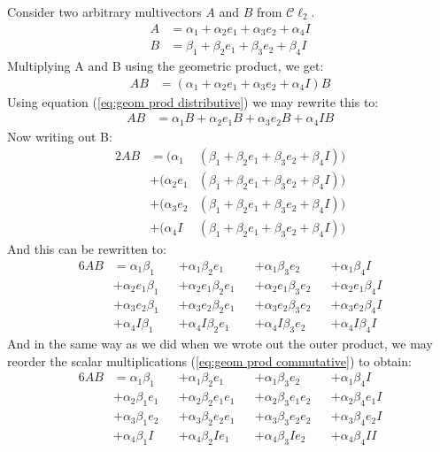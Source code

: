 \documentclass[10pt]{report}
\begin{document}
Consider two arbitrary multivectors $A$ and $B$ from
$\mathcal{C}\ell_2$.
\begin{align}
    A &= \alpha_1 + \alpha_2 e_1 +\alpha_3 e_2 + \alpha_4 I \nonumber \\
    B &= \beta_1 + \beta_2 e_1 + \beta_3 e_2 + \beta_4 I    \nonumber
\end{align}
Multiplying A and B using the geometric product, we get:
\begin{align}
    AB &= (\alpha_1 + \alpha_2 e_1 +\alpha_3 e_2 + \alpha_4 I)B \nonumber
\end{align}
Using equation (\ref{eq:geom prod distributive}) we may rewrite
this to:
\begin{align}
    AB &= \alpha_1 B + \alpha_2 e_1 B + \alpha_3 e_2 B + \alpha_4 I B \nonumber
\end{align}
Now writing out B:
\begin{alignat}{2}
    AB &= (\alpha_1     &(\beta_1 + \beta_2 e_1 + \beta_3 e_2 + \beta_4 I))   \nonumber\\
       &+ (\alpha_2 e_1 &(\beta_1 + \beta_2 e_1 + \beta_3 e_2 + \beta_4 I))   \nonumber\\
       &+ (\alpha_3 e_2 &(\beta_1 + \beta_2 e_1 + \beta_3 e_2 + \beta_4 I))   \nonumber\\
       &+ (\alpha_4 I   &(\beta_1 + \beta_2 e_1 + \beta_3 e_2 + \beta_4 I))   \nonumber
\end{alignat}
And this can be rewritten to:
\begin{alignat}{6}
    AB &= \alpha_1 \beta_1     &&+\alpha_1     \beta_2 e_1 &&+ \alpha_1     \beta_3 e_2 &&+ \alpha_1     \beta_4 I \nonumber\\
       &+ \alpha_2 e_1 \beta_1 &&+\alpha_2 e_1 \beta_2 e_1 &&+ \alpha_2 e_1 \beta_3 e_2 &&+ \alpha_2 e_1 \beta_4 I \nonumber\\
       &+ \alpha_3 e_2 \beta_1 &&+\alpha_3 e_2 \beta_2 e_1 &&+ \alpha_3 e_2 \beta_3 e_2 &&+ \alpha_3 e_2 \beta_4 I \nonumber\\
       &+ \alpha_4 I   \beta_1 &&+\alpha_4 I   \beta_2 e_1 &&+ \alpha_4 I   \beta_3 e_2 &&+ \alpha_4 I   \beta_4 I \nonumber
\end{alignat}
And in the same way as we did when we wrote out the outer product,
we may reorder the scalar multiplications (\ref{eq:geom prod
commutative}) to obtain:
\begin{alignat}{6}
    \label{eq:full_geomprod_2d}
    AB &= \alpha_1 \beta_1     &&+\alpha_1 \beta_2      e_1 &&+ \alpha_1 \beta_3     e_2 &&+ \alpha_1 \beta_4     I \\
       &+ \alpha_2 \beta_1 e_1 &&+\alpha_2 \beta_2  e_1 e_1 &&+ \alpha_2 \beta_3 e_1 e_2 &&+ \alpha_2 \beta_4 e_1 I \nonumber\\
       &+ \alpha_3 \beta_1 e_2 &&+\alpha_3 \beta_2  e_2 e_1 &&+ \alpha_3 \beta_3 e_2 e_2 &&+ \alpha_3 \beta_4 e_2 I \nonumber\\
       &+ \alpha_4 \beta_1 I   &&+\alpha_4 \beta_2  I   e_1 &&+ \alpha_4 \beta_3 I   e_2 &&+ \alpha_4 \beta_4 I   I \nonumber
\end{alignat}
\end{document}
